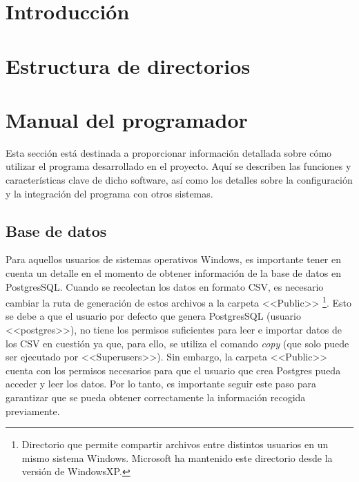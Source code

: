 
\section{Introducción}



\section{Estructura de directorios}

\section{Manual del programador}

Esta sección está destinada a proporcionar información detallada sobre cómo utilizar el programa desarrollado en el proyecto. Aquí se describen las funciones y características clave de dicho software, así como los detalles sobre la configuración y la integración del programa con otros sistemas.

\subsection{Base de datos}
Para aquellos usuarios de sistemas operativos Windows, es importante tener en cuenta un detalle en el momento de obtener información de la base de datos en PostgresSQL. Cuando se recolectan los datos en formato CSV, es necesario cambiar la ruta de generación de estos archivos a la carpeta <<Public>> \footnote{Directorio que permite compartir archivos entre distintos usuarios en un mismo sistema Windows. Microsoft ha mantenido este directorio desde la versión de WindowsXP.}. Esto se debe a que el usuario por defecto que genera PostgresSQL (usuario <<postgres>>), no tiene los permisos suficientes para leer e importar datos de los CSV en cuestión ya que, para ello, se utiliza el comando \textit{copy} (que solo puede ser ejecutado por <<Superusers>>)\cite{Dominguez2020}. Sin embargo, la carpeta <<Public>> cuenta con los permisos necesarios para que el usuario que crea Postgres pueda acceder y leer los datos. Por lo tanto, es importante seguir este paso para garantizar que se pueda obtener correctamente la información recogida previamente.





